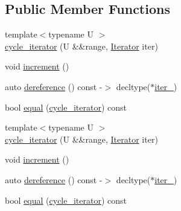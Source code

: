\subsection*{Public Member Functions}
\begin{DoxyCompactItemize}
\item 
{\footnotesize template$<$typename U $>$ }\\\mbox{\hyperlink{structrah_1_1view_1_1cycle__iterator_a69b737bdbd97194bb5cfc0470fd60e58}{cycle\+\_\+iterator}} (U \&\&range, \mbox{\hyperlink{structrah_1_1view_1_1cycle__iterator_ac9761016862e6bb26b0ca5e923344b83}{Iterator}} iter)
\item 
void \mbox{\hyperlink{structrah_1_1view_1_1cycle__iterator_afa27786b512afe924d063245d7bdc3ea}{increment}} ()
\item 
auto \mbox{\hyperlink{structrah_1_1view_1_1cycle__iterator_a06349419766f9078983fa3db221a3bd8}{dereference}} () const -\/$>$ decltype($\ast$\mbox{\hyperlink{structrah_1_1view_1_1cycle__iterator_a49dea5baf32f7e9bc237b6f534513ada}{iter\+\_\+}})
\item 
bool \mbox{\hyperlink{structrah_1_1view_1_1cycle__iterator_a9e2138807dd1c35fbc202b05fa0dd933}{equal}} (\mbox{\hyperlink{structrah_1_1view_1_1cycle__iterator}{cycle\+\_\+iterator}}) const
\item 
{\footnotesize template$<$typename U $>$ }\\\mbox{\hyperlink{structrah_1_1view_1_1cycle__iterator_a69b737bdbd97194bb5cfc0470fd60e58}{cycle\+\_\+iterator}} (U \&\&range, \mbox{\hyperlink{structrah_1_1view_1_1cycle__iterator_ac9761016862e6bb26b0ca5e923344b83}{Iterator}} iter)
\item 
void \mbox{\hyperlink{structrah_1_1view_1_1cycle__iterator_afa27786b512afe924d063245d7bdc3ea}{increment}} ()
\item 
auto \mbox{\hyperlink{structrah_1_1view_1_1cycle__iterator_a06349419766f9078983fa3db221a3bd8}{dereference}} () const -\/$>$ decltype($\ast$\mbox{\hyperlink{structrah_1_1view_1_1cycle__iterator_a49dea5baf32f7e9bc237b6f534513ada}{iter\+\_\+}})
\item 
bool \mbox{\hyperlink{structrah_1_1view_1_1cycle__iterator_a9e2138807dd1c35fbc202b05fa0dd933}{equal}} (\mbox{\hyperlink{structrah_1_1view_1_1cycle__iterator}{cycle\+\_\+iterator}}) const
\end{DoxyCompactItemize}
